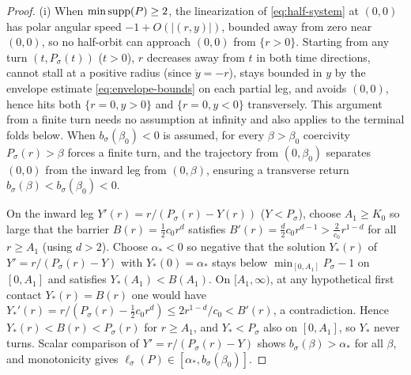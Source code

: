 \begin{proof}
(i) When $\min\operatorname{supp}(P)\ge 2$, the linearization of \eqref{eq:half-system} at $(0,0)$ has polar angular
speed $-1+O(|(r,y)|)$, bounded away from zero near $(0,0)$, so no half-orbit can approach $(0,0)$ from
$\{r>0\}$. Starting from any turn $(t,P_\sigma(t))$ ($t>0$), $r$ decreases away from $t$ in both time
directions, cannot stall at a positive radius (since $\dot{y}=-r$), stays bounded in $y$ by the envelope estimate
\eqref{eq:envelope-bounds} on each partial leg, and avoids $(0,0)$, hence hits both $\{r=0,y>0\}$ and $\{r=0,y<0\}$
transversely. This argument from a finite turn needs no assumption at
infinity and also applies to the terminal folds below. When $b_\sigma(\beta_0)<0$ is assumed, for every $\beta>\beta_0$ coercivity
$P_\sigma(r)>\beta$ forces a finite turn, and the trajectory from $(0,\beta_0)$ separates $(0,0)$ from
the inward leg from $(0,\beta)$, ensuring a transverse return $b_\sigma(\beta)<b_\sigma(\beta_0)<0$.

On the inward leg $Y'(r)=r/(P_\sigma(r)-Y(r))$ ($Y<P_\sigma$), choose $A_1\ge K_0$ so large that the
barrier $B(r)=\frac{1}{2}c_0 r^d$ satisfies $B'(r)=\frac{d}{2}c_0 r^{d-1} > \frac{2}{c_0}r^{1-d}$ for
all $r\ge A_1$ (using $d>2$). Choose $\alpha_*<0$ so negative that the solution $Y_*(r)$ of
$Y'=r/(P_\sigma(r)-Y)$ with $Y_*(0)=\alpha_*$ stays below $\min_{[0,A_1]}P_\sigma-1$ on $[0,A_1]$ and
satisfies $Y_*(A_1)<B(A_1)$. On $[A_1,\infty)$, at any hypothetical first contact $Y_*(r)=B(r)$ one
would have $Y_*'(r)=r/(P_\sigma(r)-\frac{1}{2}c_0 r^d)\le 2r^{1-d}/c_0 < B'(r)$, a contradiction.
Hence $Y_*(r)<B(r)<P_\sigma(r)$ for $r\ge A_1$, and $Y_*<P_\sigma$ also on $[0,A_1]$, so $Y_*$ never
turns. Scalar comparison of $Y'=r/(P_\sigma(r)-Y)$ shows $b_\sigma(\beta)>\alpha_*$ for all $\beta$,
and monotonicity gives $\ell_\sigma(P)\in[\alpha_*,b_\sigma(\beta_0)]$.


\end{proof}
